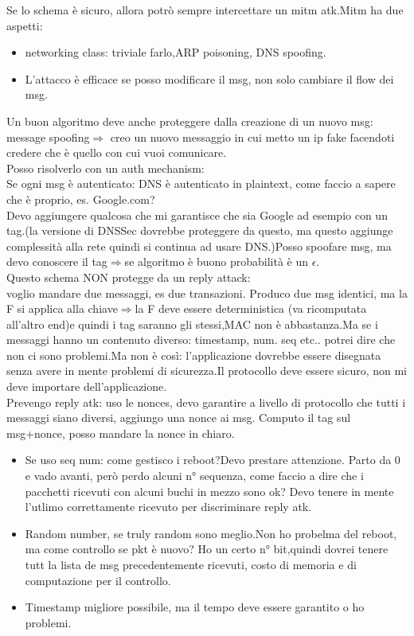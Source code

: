 \documentclass[16px]{article}
\begin{document}
Se lo schema è sicuro, allora potrò sempre intercettare un mitm atk.Mitm ha due aspetti:
\begin{itemize}
\item networking class: triviale farlo,ARP poisoning, DNS spoofing.\\
\item L'attacco è efficace se posso modificare il msg, non solo cambiare il flow dei msg.
\end{itemize}
Un buon algoritmo deve anche proteggere dalla creazione di un nuovo msg: message spoofing$\Rightarrow$ creo un nuovo messaggio in cui metto un ip fake facendoti credere che è quello con cui vuoi comunicare.\\
Posso risolverlo con un auth mechanism:\\
Se ogni msg è autenticato: DNS è autenticato in plaintext, come faccio a sapere che è proprio, es. Google.com?\\
Devo aggiungere qualcosa che mi garantisce che sia Google ad esempio con un tag.(la versione di DNSSec dovrebbe proteggere da questo, ma questo aggiunge complessità alla rete quindi si continua ad usare DNS.)Posso spoofare msg, ma devo conoscere il tag$\Rightarrow$se algoritmo è buono probabilità è un $\epsilon$.\\
Questo schema NON protegge da un reply attack:\\
voglio mandare due messaggi, es due transazioni. Produco due msg identici, ma la F si applica alla chiave$\Rightarrow$la F deve essere deterministica (va ricomputata all'altro end)e quindi i tag saranno gli stessi,MAC non è abbastanza.Ma se i messaggi hanno un contenuto diverso: timestamp, num. seq etc.. potrei dire che non ci sono problemi.Ma non è così: l'applicazione dovrebbe essere disegnata senza avere in mente problemi di sicurezza.Il protocollo deve essere sicuro, non mi deve importare dell'applicazione.\\
Prevengo reply atk: uso le nonces, devo garantire a livello di protocollo che tutti i messaggi siano diversi, aggiungo una nonce ai msg. Computo il tag sul msg+nonce, posso mandare la nonce in chiaro.\\
\begin{itemize}
\item Se uso seq num: come gestisco i reboot?Devo prestare attenzione.
Parto da 0 e vado avanti, però perdo alcuni n° sequenza, come faccio a dire che i pacchetti ricevuti con alcuni buchi in mezzo sono ok? Devo tenere in mente l'utlimo correttamente ricevuto per discriminare reply atk.
\item Random number, se truly random sono meglio.Non ho probelma del reboot, ma come controllo se pkt è nuovo? Ho un certo n° bit,quindi dovrei tenere tutt la lista de msg precedentemente ricevuti, costo di memoria  e di computazione per il controllo.
\item Timestamp migliore possibile, ma il tempo deve essere garantito o ho problemi.
\end{itemize}
\end{document}
